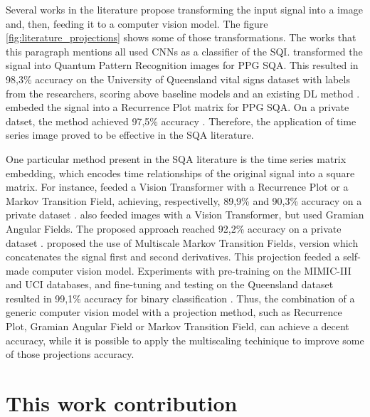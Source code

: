 Several works in the literature propose transforming the input signal into a image and, then, feeding it to a computer vision model. The figure \ref{fig:literature_projections} shows some of those transformations. The works that this paragraph mentions all used \gls{CNN}s as a classifier of the \gls{SQI}. \citeauthor{review-13} transformed the signal into Quantum Pattern Recognition images for PPG \gls{SQA}. This resulted in 98,3\% accuracy on the University of Queensland vital signs dataset with labels from the researchers, scoring above baseline models and an existing \gls{DL} method \cite{review-13}. \citeauthor{review-15} embeded the signal into a Recurrence Plot matrix for PPG \gls{SQA}. On a private datset, the method achieved 97,5\% accuracy \cite{review-15}. Therefore, the application of time series image proved to be effective in the \gls{SQA} literature.  

One particular method present in the \gls{SQA} literature is the time series matrix embedding, which encodes time relationships of the original signal into a square matrix. For instance, \citeauthor{review-16} feeded a Vision Transformer with a Recurrence Plot or a Markov Transition Field, achieving, respectivelly, 89,9\% and 90,3\% accuracy on a private dataset \cite{review-16}. \citeauthor{review-17} also feeded images with a Vision Transformer, but used Gramian Angular Fields. The proposed approach reached 92,2\% accuracy on a private dataset \cite{review-17}. \citeauthor{review-18} proposed the use of Multiscale Markov Transition Fields, version which concatenates the signal first and second derivatives. This projection feeded a self-made computer vision model. Experiments with pre-training on the MIMIC-III and UCI databases, and fine-tuning and testing on the Queensland dataset resulted in 99,1\% accuracy for binary classification \cite{review-18}. Thus, the combination of a generic computer vision model with a projection method, such as Recurrence Plot, Gramian Angular Field or Markov Transition Field, can achieve a decent accuracy, while it is possible to apply the multiscaling techinique to improve some of those projections accuracy. 

\section{This work contribution}
\label{sec:my_work}


